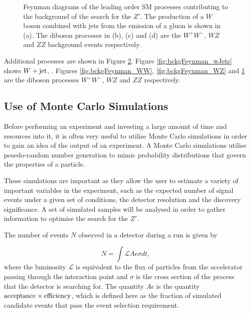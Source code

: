 \documentclass{article}
\begin{document}
\begin{figure}[htb]
\begin{subfigure}{.25\textwidth}
        \caption{}
        \label{fig:bckgFeynman_ZZ}
    \end{subfigure}
    \caption{Feynman diagrams of the leading order SM processes contributing to the background of the search for the $Z'$. The production of a $W$ boson combined with jets from the emission of a gluon is shown in (a). The diboson processes in (b), (c) and (d) are the $W^+W^-$, $WZ$ and $ZZ$ background events respectively.\label{fig:bckgFeynman}}
\end{figure}

Additional processes are shown in Figure \ref{fig:bckgFeynman}. Figure \ref{fig:bckgFeynman_wJets} shows $W+\rm{jet}$, . Figures \ref{fig:bckgFeynman_WW}, \ref{fig:bckgFeynman_WZ} and \ref{fig:bckgFeynman_ZZ} are the diboson processes $W^+W^-$, $WZ$ and $ZZ$ respectively.

\subsection{Use of Monte Carlo Simulations}%

Before performing an experiment and investing a large amount of time and resources into it, it is often very useful to utilise Monte Carlo simulations in order to gain an idea of the output of an experiment. A Monte Carlo simulations utilise psuedo-random number generation to mimic probability distributions that govern the properties of a particle.

These simulations are important as they allow the user to estimate a variety of important variables in the experiment, such as the expected number of signal events under a given set of conditions, the detector resolution and the discovery significance. A set of simulated samples will be analysed in order to gather information to optimise the search for the $Z'$. 

The number of events $N$ observed in a detector during a run is given by

\begin{equation}
N = \int \mathcal{L}A\epsilon\sigma dt ,
\end{equation}
where the luminosity $\mathcal{L}$ is equivalent to the flux of particles from the accelerator passing through the interaction point and $\sigma$ is the cross section of the process that the detector is searching for. The quantity $A\epsilon$ is the quantity $\rm{acceptance} \times \rm{efficiency}$, which is defined here as the fraction of simulated candidate events that pass the event selection requirement.
\end{document}
